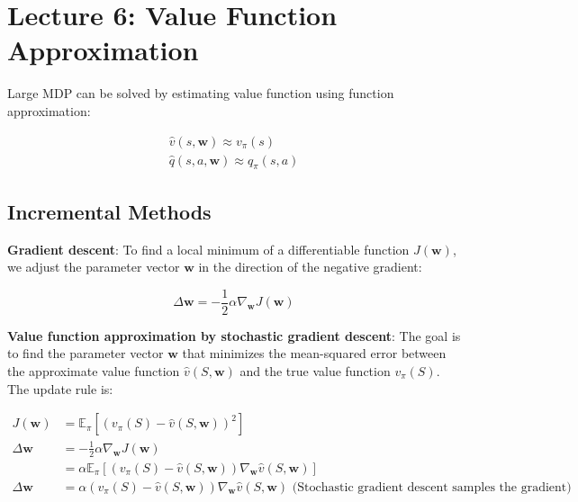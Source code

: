 \section{Lecture 6: Value Function Approximation}

Large MDP can be solved by estimating value function using function
approximation:

\begin{gather*}
    \hat{v}(s, \mathbf{w}) \approx v_\pi(s) \\
    \hat{q}(s, a, \mathbf{w}) \approx q_\pi(s, a)
\end{gather*}

\subsection{Incremental Methods}

\noindent \textbf{Gradient descent}: To find a local minimum of a differentiable function
$J(\mathbf{w})$, we adjust the parameter vector $\mathbf{w}$ in the direction
of the negative gradient:

\begin{equation*}
    \Delta \mathbf{w} = -\frac{1}{2} \alpha \nabla_\mathbf{w} J(\mathbf{w})
\end{equation*}

\noindent \textbf{Value function approximation by stochastic gradient descent}: The goal
is to find the parameter vector $\mathbf{w}$ that minimizes the mean-squared error between
the approximate value function $\hat{v}(S, \mathbf{w})$ and the true value function $v_\pi(S)$.
The update rule is:

\begin{align*}
    J(\mathbf{w})     & = \mathbb{E}_\pi \left[ \left( v_\pi(S) - \hat{v}(S, \mathbf{w}) \right)^2 \right]                                                               \\
    \Delta \mathbf{w} & = -\frac{1}{2} \alpha \nabla_\mathbf{w} J(\mathbf{w})                                                                                            \\
                      & = \alpha \mathbb{E}_\pi \left[ (v_\pi(S) - \hat{v}(S, \mathbf{w})) \nabla_\mathbf{w} \hat{v}(S, \mathbf{w}) \right]                              \\
    \Delta \mathbf{w} & = \alpha (v_\pi(S) - \hat{v}(S, \mathbf{w})) \nabla_\mathbf{w} \hat{v}(S, \mathbf{w}) \text{ (Stochastic gradient descent samples the gradient)}
\end{align*}

